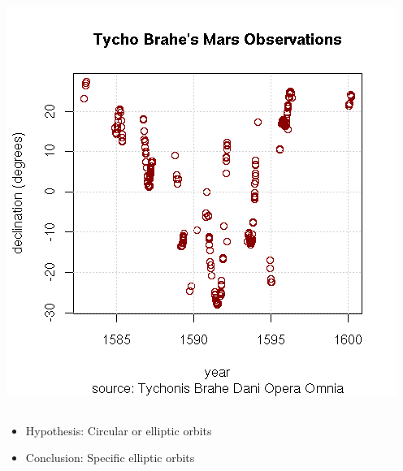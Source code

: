 \documentclass{beamer}
\begin{document}
\begin{frame}
\begin{columns}
\begin{column}{0.5\textwidth}
      \includegraphics[width=\columnwidth]{../figures/tycho-observations}
    \end{column}
  \end{columns}
  \begin{itemize}
  \item Hypothesis: Circular \alert{or} elliptic orbits
  \item Conclusion: Specific \alert{elliptic} orbits
  \end{itemize}
\end{frame}

\end{document}
